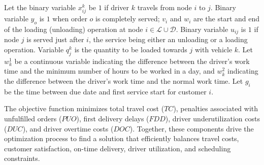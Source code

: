 \documentclass{article}
\begin{document}
Let the binary variable $x^{k}_{ij}$ be $1$ if driver $k$ travels from node $i$ to $j$. Binary variable $y_o$ is $1$ when order $o$ is completely served; $v_i$ and $w_i$ are the start and end of the loading (unloading) operation at node $i \in \mathcal{L}\cup \mathcal{D}$. Binary variable $u_{ij}$ is $1$ if node $j$ is served just after $i$, the service being either an unloading or a loading operation. %
Variable $q^k_j$ is the quantity to be loaded towards $j$ with vehicle $k$. Let $w^1_k$ be a continuous variable indicating the difference between the driver's work time and the minimum number of hours to be worked in a day, and $w^2_k$ indicating the difference between the driver's work time and the normal work time. Let $g_i$ be the time between due date and first service start for customer $i$.

The objective function minimizes total travel cost ($TC$), penalties associated with unfulfilled orders ($PUO$), first delivery delays ($FDD$), driver underutilization costs ($DUC$), and driver overtime costs ($DOC$). Together, these components drive the optimization process to find a solution that efficiently balances travel costs, customer satisfaction, on-time delivery, driver utilization, and scheduling constraints.

\end{document}
